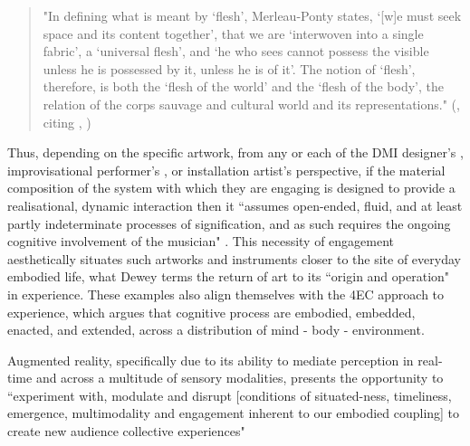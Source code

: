 \begin{quote}
    "In defining what is meant by `flesh', Merleau-Ponty states, `[w]e must seek space and its content together', that we are `interwoven into a single fabric', a `universal flesh', and `he who sees cannot possess the visible unless he is possessed by it, unless he is of it'. The notion of `flesh', therefore, is both the `flesh of the world' and the `flesh of the body', the relation of the corps sauvage and cultural world and its representations." (\citeauthor{chevalier2018}, \citeyearpar{chevalier2018}  citing \citeauthor{merleau-ponty1945}, \citeyearpar{merleau-ponty1945,merleau-ponty1968})
\end{quote}

Thus, depending on the specific artwork, from any or each of the DMI designer's \citep[]{essl2006,armstrong2006}, improvisational performer's \citep[]{hayes2019}, or installation artist's \citep[]{chevalier2018} perspective, if the material composition of the system with which they are engaging is designed to provide a realisational, dynamic interaction then it ``assumes open-ended, fluid, and at least partly indeterminate processes of signification, and as such requires the ongoing cognitive involvement of the musician" \citep[p. 48]{armstrong2006}. This necessity of engagement aesthetically situates such artworks and instruments closer to the site of everyday embodied life, what Dewey terms the return of art to its ``origin and operation" in experience. These examples also align themselves with the 4EC approach to experience, which argues that cognitive process are embodied, embedded, enacted, and extended, across a distribution of mind - body - environment. 

Augmented reality, specifically due to its ability to mediate perception in real-time and across a multitude of sensory modalities, presents the opportunity to ``experiment with, modulate and disrupt [conditions of situated-ness, timeliness, emergence, multimodality and engagement inherent to our embodied coupling] to create new audience collective experiences" \citep[]{chevalier2018}



